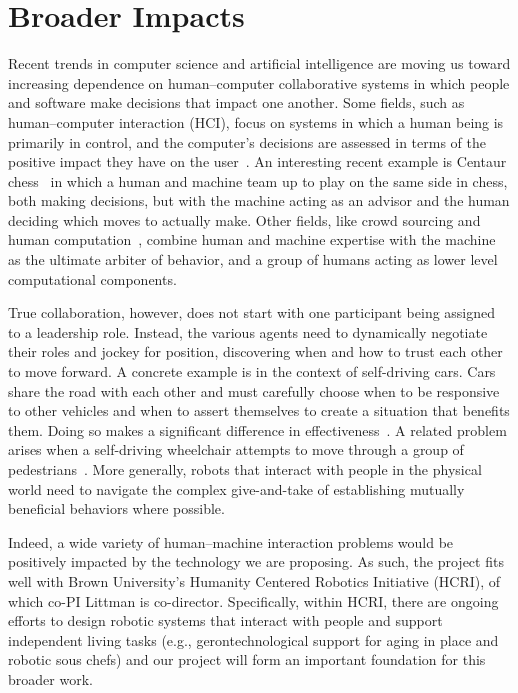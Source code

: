 
\section{Broader Impacts}

Recent trends in computer science and artificial intelligence are
moving us toward increasing dependence on human--computer
collaborative systems in which people and software make decisions that
impact one another.  Some fields, such as human--computer interaction
(HCI), focus on systems in which a human being is primarily in
control, and the computer's decisions are assessed in terms of the
positive impact they have on the user~\cite{maes1993learning}.  An
interesting recent example is Centaur
chess~\cite{cassidy14}
in which a human and machine team up to play on the same side in
chess, both making decisions, but with the machine acting as an
advisor and the human deciding which moves to actually make.  Other
fields, like crowd sourcing and human computation~\cite{von2009human},
combine human and machine expertise with the machine as the ultimate
arbiter of behavior, and a group of humans acting as lower level
computational components.

True collaboration, however, does not start with one participant being
assigned to a leadership role.  Instead, the various agents need to
dynamically negotiate their roles and jockey for position, discovering
when and how to trust each other to move forward.  A concrete example
is in the context of self-driving cars.  Cars share the road with each
other and must carefully choose when to be responsive to other
vehicles and when to assert themselves to create a situation that
benefits them.  Doing so makes a significant difference in
effectiveness~\cite{cunningham2015mpdm}.  A related problem arises
when a self-driving wheelchair attempts to move through a group of
pedestrians~\cite{kim2016socially}.  More generally, robots that
interact with people in the physical world need to navigate the
complex give-and-take of establishing mutually beneficial behaviors
where possible.

Indeed, a wide variety of human--machine interaction problems would be
positively impacted by the technology we are proposing.
%
As such, the project fits well with Brown University's Humanity
Centered Robotics Initiative (HCRI), of which co-PI Littman is
co-director.  Specifically, within HCRI, there are ongoing efforts to
design robotic systems that interact with people and support
independent living tasks (e.g., gerontechnological support for aging
in place and robotic sous chefs) and our project will form an
important foundation for this broader work.

